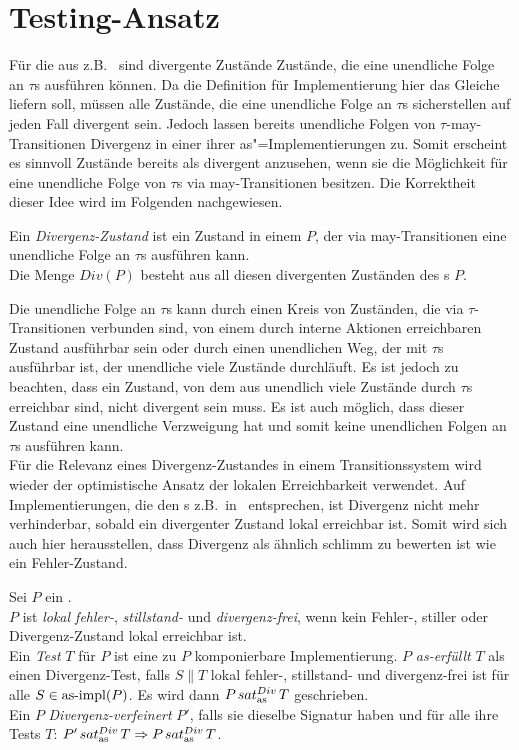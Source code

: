 \section{Testing-Ansatz}

Für die \EIO{} aus z.B.~\cite{Schinko2016BA} sind divergente Zustände Zustände,
die eine unendliche Folge an $\tau$s ausführen können. Da die Definition für
Implementierung hier das Gleiche liefern soll, müssen alle Zustände, die eine
unendliche Folge an $\tau$s sicherstellen auf jeden Fall divergent sein. Jedoch
lassen bereits unendliche Folgen von $\tau$-may-Transitionen Divergenz in einer
ihrer as"=Implementierungen zu. Somit erscheint es sinnvoll Zustände bereits
als divergent anzusehen, wenn sie die Möglichkeit für eine unendliche Folge von
$\tau$s via may-Transitionen besitzen. Die Korrektheit dieser Idee wird im
Folgenden nachgewiesen.

\begin{Def}[Divergenz]
  Ein \emph{Divergenz-Zustand} ist ein Zustand in einem \MEIO{} $P$, der via
  may-Transitionen eine unendliche Folge an $\tau$s ausführen kann.\\
  Die Menge $Div(P)$ besteht aus all diesen divergenten Zuständen des \MEIO{}s
  $P$.
\end{Def}

Die unendliche Folge an $\tau$s kann durch einen Kreis von Zuständen, die via
$\tau$-Transitionen verbunden sind, von einem durch interne Aktionen
erreichbaren Zustand ausführbar sein oder durch einen unendlichen Weg, der mit
$\tau$s ausführbar ist, der unendliche viele Zustände durchläuft. Es ist jedoch
zu beachten, dass ein Zustand, von dem aus unendlich viele Zustände durch
$\tau$s  erreichbar sind, nicht divergent sein muss. Es ist auch möglich,
dass dieser Zustand eine unendliche Verzweigung hat und somit keine unendlichen
Folgen an $\tau$s ausführen kann.\\
Für die Relevanz eines Divergenz-Zustandes in einem Transitionssystem wird
wieder der optimistische Ansatz der lokalen Erreichbarkeit verwendet. Auf
Implementierungen, die den \EIO{}s z.B.\ in~\cite{Schinko2016BA} entsprechen,
ist Divergenz nicht mehr verhinderbar, sobald ein divergenter Zustand lokal
erreichbar ist. Somit wird sich auch hier herausstellen, dass Divergenz als
ähnlich \glqq schlimm\grqq{} zu bewerten ist wie ein Fehler-Zustand.

\begin{Def}
  \label{DivTestDef}
  Sei $P$ ein \MEIO{}.\\
  $P$ ist \emph{lokal fehler-}, \emph{stillstand-} und \emph{divergenz-frei},
  wenn kein Fehler-, stiller oder Divergenz-Zustand lokal erreichbar ist.\\
  Ein \emph{Test} $T$ für $P$ ist eine zu $P$ komponierbare Implementierung.
  $P$ \emph{as-erfüllt} $T$ als einen Divergenz-Test, falls $S\|T$ lokal
  fehler-, stillstand- und divergenz-frei ist für alle $S\in \mathrm{as}\text{-}\mathrm{impl} (P)$. Es
  wird dann $P\hspace{0.05cm}sat_\mathrm{as}^{Div}\hspace{0.05cm} T$ geschrieben.\\
  Ein \MEIO{} $P$ \emph{Divergenz-verfeinert} $P'$, falls sie dieselbe
  Signatur haben und für alle ihre Tests $T$: $P'\hspace{0.05cm}sat_\mathrm{as}^{Div}\hspace{0.05cm} T \Rightarrow P\hspace{0.05cm}sat_\mathrm{as}^{Div}\hspace{0.05cm}
  T$.
\end{Def}


